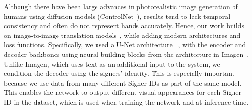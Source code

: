Although there have been large advances in photorealistic image generation of humans using diffusion models (\eg ControlNet~\cite{zhang2023adding}), results tend to lack temporal consistency and often do not represent hands accurately. Hence, our work builds on image-to-image translation models~\cite{isola2017image, brooks2023instructpix2pix, tumanyan2023plug, hertz2022prompt, zhang2023adding}, while adding modern architectures and loss functions. 
Specifically, we used a U-Net architecture ~\cite{ronneberger2015u}, with the encoder and decoder backbones using neural building blocks from the architecture in Imagen~\cite{saharia2022photorealistic}. 
Unlike Imagen, which uses text as an additional input to the system, we condition the decoder using the signers' identity. 
This is especially important because we use data from many different Signer IDs as part of the same model.
This enables the network to output different visual appearances for each Signer ID in the dataset, which is used when training the network and at inference time. 

